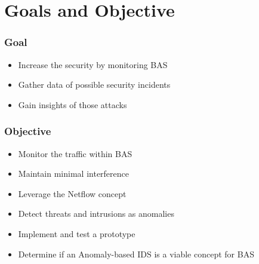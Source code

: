 \section{Goals and Objective}
\begin{frame}[c]
	\frametitle{Goal}
	
	\begin{itemize}
		\item Increase the security by monitoring BAS
		\item Gather data of possible security incidents
		\item Gain insights of those attacks
	\end{itemize}

\end{frame}

\begin{frame}[c]
	\frametitle{Objective}
	
	\begin{itemize}
		\item Monitor the traffic within BAS
		\item Maintain minimal interference
		\item Leverage the Netflow concept
		\item Detect threats and intrusions as anomalies
		\item Implement and test a prototype
		\item Determine if an Anomaly-based IDS is a viable concept for BAS
	\end{itemize}
	
\end{frame}

